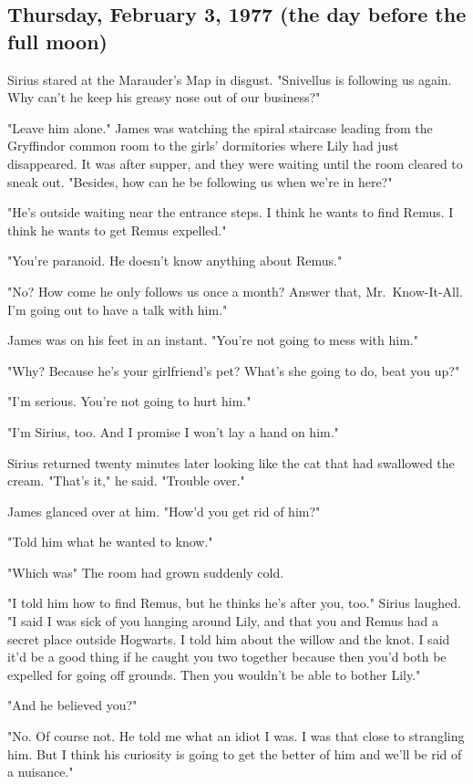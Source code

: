 \subsection{Thursday, February 3, 1977 (the day before the full moon)}

Sirius stared at the Marauder's Map in disgust. "Snivellus is following us again. Why can't he keep his greasy nose out of our business?"

"Leave him alone." James was watching the spiral staircase leading from the Gryffindor common room to the girls' dormitories where Lily had just disappeared. It was after supper, and they were waiting until the room cleared to sneak out. "Besides, how can he be following us when we're in here?"

"He's outside waiting near the entrance steps. I think he wants to find Remus. I think he wants to get Remus expelled."

"You're paranoid. He doesn't know anything about Remus."

"No? How come he only follows us once a month? Answer that, Mr.~Know-It-All. I'm going out to have a talk with him."

James was on his feet in an instant. "You're not going to mess with him."

"Why? Because he's your girlfriend's pet? What's she going to do, beat you up?"

"I'm serious. You're not going to hurt him."

"I'm Sirius, too. And I promise I won't lay a hand on him."

Sirius returned twenty minutes later looking like the cat that had swallowed the cream. "That's it," he said. "Trouble over."

James glanced over at him. "How'd you get rid of him?"

"Told him what he wanted to know."

"Which was{\el}" The room had grown suddenly cold.

"I told him how to find Remus, but he thinks he's after you, too." Sirius laughed. "I said I was sick of you hanging around Lily, and that you and Remus had a secret place outside Hogwarts. I told him about the willow and the knot. I said it'd be a good thing if he caught you two together because then you'd both be expelled for going off grounds. Then you wouldn't be able to bother Lily."

"And he believed you?"

"No. Of course not. He told me what an idiot I was. I was that close to strangling him. But I think his curiosity is going to get the better of him and we'll be rid of a nuisance."

